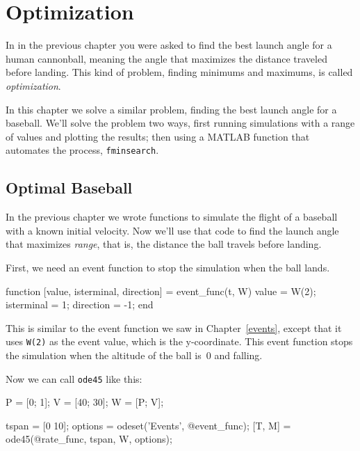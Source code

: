 \chapter{Optimization}

In  in the previous chapter you were asked to find the best launch angle for a human cannonball, meaning the angle that maximizes the distance traveled before landing.  This kind of problem, finding minimums and maximums, is called {\em optimization}.

In this chapter we solve a similar problem, finding the best launch angle for a baseball.
We'll solve the problem two ways, first running simulations with a range of values and plotting the results; then using a MATLAB function that automates the process, \lstinline{fminsearch}.

\section{Optimal Baseball}

In the previous chapter we wrote functions to simulate the flight of a baseball with a known initial velocity.  Now we'll use that code to find the launch angle that maximizes {\em range}, that is, the distance the ball travels before landing.


First, we need an event function to stop the simulation when the ball lands.

\begin{code}
function [value, isterminal, direction] = event_func(t, W)
    value = W(2);
    isterminal = 1;
    direction = -1;
end
\end{code}


This is similar to the event function we saw in Chapter~\ref{events}, except that it uses \lstinline{W(2)} as the event value, which is the y-coordinate.  This event function stops the simulation when the altitude of the ball is~0 and falling.

Now we can call \lstinline{ode45} like this:

\begin{code}
    P = [0; 1];       %
    V = [40; 30];     %
    W = [P; V];       %
    
    tspan = [0 10];
    options = odeset('Events', @event_func);
    [T, M] = ode45(@rate_func, tspan, W, options);
\end{code}

